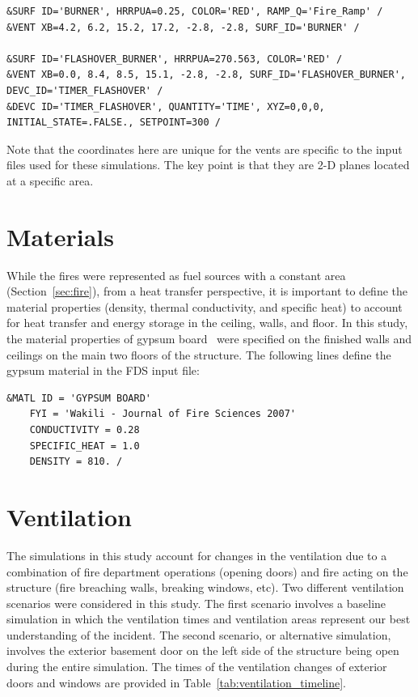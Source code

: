 \documentclass[12pt,oneside]{book}
\begin{document}
\begin{lstlisting}
&SURF ID='BURNER', HRRPUA=0.25, COLOR='RED', RAMP_Q='Fire_Ramp' /
&VENT XB=4.2, 6.2, 15.2, 17.2, -2.8, -2.8, SURF_ID='BURNER' /

&SURF ID='FLASHOVER_BURNER', HRRPUA=270.563, COLOR='RED' /
&VENT XB=0.0, 8.4, 8.5, 15.1, -2.8, -2.8, SURF_ID='FLASHOVER_BURNER', DEVC_ID='TIMER_FLASHOVER' /
&DEVC ID='TIMER_FLASHOVER', QUANTITY='TIME', XYZ=0,0,0, INITIAL_STATE=.FALSE., SETPOINT=300 /
\end{lstlisting}
Note that the coordinates here are unique for the vents are specific to the input files used for these simulations. The key point is that they are 2-D planes located at a specific area.

\section{Materials}
\label{sec:materials}

While the fires were represented as fuel sources with a constant area (Section~\ref{sec:fire}), from a heat transfer perspective, it is important to define the material properties (density, thermal conductivity, and specific heat) to account for heat transfer and energy storage in the ceiling, walls, and floor. In this study, the material properties of gypsum board~\cite{WAKILI2007} were specified on the finished walls and ceilings on the main two floors of the structure. The following lines define the gypsum material in the FDS input file:

\begin{lstlisting}
&MATL ID = 'GYPSUM BOARD'
    FYI = 'Wakili - Journal of Fire Sciences 2007' 
    CONDUCTIVITY = 0.28
    SPECIFIC_HEAT = 1.0
    DENSITY = 810. /
\end{lstlisting}

\section{Ventilation}
\label{sec:ventilation}

The simulations in this study account for changes in the ventilation due to a combination of fire department operations (opening doors) and fire acting on the structure (fire breaching walls, breaking windows, etc). Two different ventilation scenarios were considered in this study. The first scenario involves a baseline simulation in which the ventilation times and ventilation areas represent our best understanding of the incident. The second scenario, or alternative simulation, involves the exterior basement door on the left side of the structure being open during the entire simulation. The times of the ventilation changes of exterior doors and windows are provided in Table~\ref{tab:ventilation_timeline}.
\end{document}

